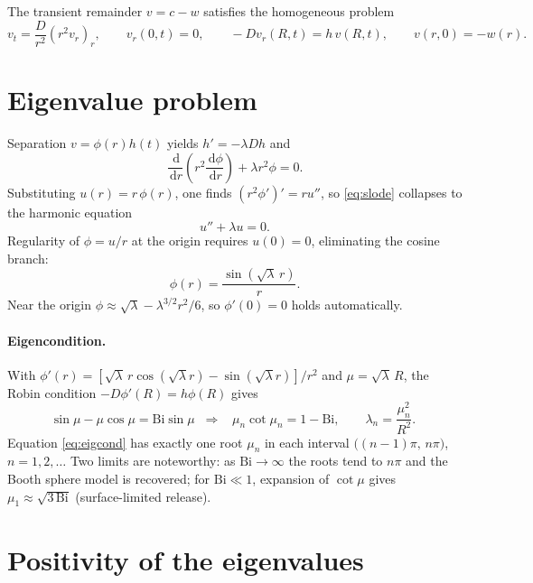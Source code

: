 \documentclass[11pt,a4paper]{article}
\newcommand{\Bi}{\mathrm{Bi}}
\newcommand{\dd}{\,\mathrm{d}}
\begin{document}
The transient remainder $v = c - w$ satisfies the homogeneous problem
\begin{equation}
v_t = \frac{D}{r^2}\left(r^2 v_r\right)_r, \qquad
v_r(0,t)=0,\qquad -Dv_r(R,t) = h\,v(R,t), \qquad
v(r,0) = -w(r).
\label{eq:vproblem}
\end{equation}

\section{Eigenvalue problem}

Separation $v = \phi(r)h(t)$ yields $h' = -\lambda D h$ and
\begin{equation}
\frac{\dd}{\dd r}\!\left(r^2\frac{\dd\phi}{\dd r}\right) + \lambda r^2 \phi = 0 .
\label{eq:slode}
\end{equation}
Substituting $u(r) = r\,\phi(r)$, one finds $\left(r^2\phi'\right)' = r u''$, so
\eqref{eq:slode} collapses to the harmonic equation
\begin{equation}
u'' + \lambda u = 0 .
\end{equation}
Regularity of $\phi = u/r$ at the origin requires $u(0)=0$, eliminating the cosine
branch:
\begin{equation}
\phi(r) = \frac{\sin\!\left(\sqrt{\lambda}\,r\right)}{r}.
\label{eq:eigfun}
\end{equation}
Near the origin $\phi \approx \sqrt{\lambda} - \lambda^{3/2}r^2/6$, so
$\phi'(0)=0$ holds automatically.

\paragraph{Eigencondition.} With
$\phi'(r) = \left[\sqrt{\lambda}\,r\cos(\sqrt{\lambda} r) - \sin(\sqrt{\lambda} r)\right]/r^2$
and $\mu = \sqrt{\lambda}\,R$, the Robin condition $-D\phi'(R) = h\phi(R)$ gives
\begin{equation}
\sin\mu - \mu\cos\mu = \Bi\sin\mu
\;\;\Longrightarrow\;\;
\boxed{\;\mu_n\cot\mu_n = 1 - \Bi,\qquad \lambda_n = \frac{\mu_n^2}{R^2}.\;}
\label{eq:eigcond}
\end{equation}
Equation \eqref{eq:eigcond} has exactly one root $\mu_n$ in each interval
$\big((n-1)\pi,\, n\pi\big)$, $n = 1,2,\dots$ Two limits are noteworthy: as
$\Bi\to\infty$ the roots tend to $n\pi$ and the Booth sphere model is recovered; for
$\Bi \ll 1$, expansion of $\cot\mu$ gives $\mu_1 \approx \sqrt{3\,\Bi}$
(surface-limited release).

\section{Positivity of the eigenvalues}
\end{document}
